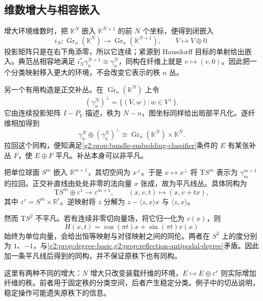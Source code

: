 \subsection{维数增大与相容嵌入}
\label{g2:subsec:1902:03}
增大环境维数时，把 \(\mathbb K^N\) 嵌入 \(\mathbb K^{N+1}\) 的前 \(N\) 个坐标，便得到闭嵌入
\[
	i_N:\operatorname{Gr}_n(\mathbb K^N)\longrightarrow\operatorname{Gr}_n(\mathbb K^{N+1}),\qquad V\longmapsto V\oplus0.
\]
投影矩阵只是在右下角添零，所以它连续；紧源到 Hausdorff 目标的单射给出嵌入。典范丛相容地满足 \(i_N^*\gamma_n^{N+1}\cong\gamma_n^N\)，同构在纤维上就是 \(v\mapsto(v,0)\)。因此把一个分类映射移入更大的环境，不会改变它表示的秩 \(n\) 丛。

\ProseParagraphBreak

另一个有用构造是正交补丛。在 \(\operatorname{Gr}_n(\mathbb K^N)\) 上令
\[
	(\gamma_n^N)^\perp=\{(V,w):w\in V^\perp\}.
\]
它由连续投影矩阵 \(I-P_V\) 描述，秩为 \(N-n\)，图坐标同样给出局部平凡化。逐纤维相加得到
\begin{equation}\label{g2:eq:tautological-orthogonal-sum}
	\gamma_n^N\oplus(\gamma_n^N)^\perp
	\cong\operatorname{Gr}_n(\mathbb K^N)\times\mathbb K^N.
\end{equation}
拉回这个同构，便知满足\cref{g2:prop:bundle-embedding-classifier}条件的 \(E\) 有某张补丛 \(F\)，使 \(E\oplus F\) 平凡。补丛本身可以非平凡。

\begin{example}\label{g2:exm:sphere-tangent-stable-triviality}
	把单位球面 \(S^m\) 嵌入 \(\mathbb R^{m+1}\)，其切空间为 \(x^\perp\)。于是 \(x\mapsto x^\perp\) 将 \(\mathrm TS^m\) 表示为 \(\gamma_m^{m+1}\) 的拉回。正交补直线由处处非零的法向量 \(x\) 张成，故为平凡线丛。具体同构为
	\[
		\mathrm TS^m\oplus\varepsilon^1\longrightarrow\varepsilon^{m+1},
		\qquad(x,v,t)\longmapsto(x,v+tx),
	\]
	其中 \(\varepsilon^r=S^m\times\mathbb R^r\)。逆映射将 \(z\) 分解为 \(z-\langle z,x\rangle x\) 与 \(\langle z,x\rangle\)。

	然而 \(\mathrm TS^2\) 不平凡。若有连续非零切向量场，将它归一化为 \(v(x)\)，则
	\[
		H(x,t)=\cos(\pi t)x+\sin(\pi t)v(x)
	\]
	始终为单位向量，会给出恒等映射与对径映射之间的同伦。两者在 \(S^2\) 上的度分别为 \(1\)、\(-1\)，与\cref{g2:prop:degree-basic,g2:prop:reflection-antipodal-degree}矛盾。因此加一条平凡线后得到的同构，并不保证原秩下也有同构。
\end{example}

这里有两种不同的增大：\(N\) 增大只改变装载纤维的环境，\(E\mapsto E\oplus\varepsilon^r\) 则实际增加纤维的秩。前者用于固定秩的分类空间，后者产生稳定分类。例子中的切丛说明，稳定操作可能遗失原秩下的信息。

